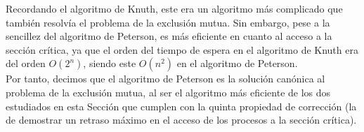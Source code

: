 Recordando el algoritmo de Knuth, este era un algoritmo más complicado que también resolvía el problema de la exclusión mutua. Sin embargo, pese a la sencillez del algoritmo de Peterson, es más eficiente en cuanto al acceso a la sección crítica, ya que el orden del tiempo de espera en el algoritmo de Knuth era del orden $O(2^n)$, siendo este $O(n^2)$ en el algoritmo de Peterson.\\

Por tanto, decimos que el algoritmo de Peterson es la solución canónica al problema de la exclusión mutua, al ser el algoritmo más eficiente de los dos estudiados en esta Sección que cumplen con la quinta propiedad de corrección (la de demostrar un retraso máximo en el acceso de los procesos a la sección crítica).





